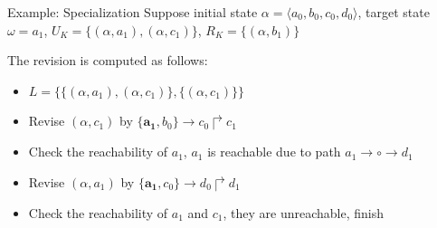 \documentclass[8pt]{beamer}
\begin{document}
\begin{frame}{Example: Specialization}
    Suppose initial state $\alpha=\langle a_0,b_0,c_0,d_0\rangle$, target state $\omega=a_1$, $U_K=\{(\alpha,a_1),(\alpha,c_1)\}$, $R_K=\{(\alpha,b_1)\}$
    \begin{figure}
        \centering
        
    \end{figure}
    The revision is computed as follows: 
    \begin{itemize}
        \item $L=\{\{(\alpha,a_1),(\alpha,c_1)\},\{(\alpha,c_1)\}\}$
        \item Revise $(\alpha,c_1)$ by $\{\mathbf{a_1}, b_0\}\to c_0\Rsh c_1$
        \item Check the reachability of $a_1$, $a_1$ is reachable due to path $a_1\to\circ\to d_1$
        \item Revise $(\alpha,a_1)$ by $\{\mathbf{a_1},c_0\}\to d_0\Rsh d_1$
        \item Check the reachability of $a_1$ and $c_1$, they are unreachable, finish
    \end{itemize}
    
\end{frame}
\end{document}
